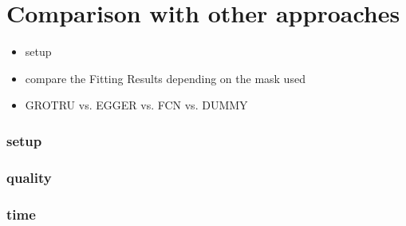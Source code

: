 \chapter{Comparison with other approaches}
	\begin{itemize}
		\item setup
		\item compare the Fitting Results depending on the mask used
		\item GROTRU vs. EGGER vs. FCN vs. DUMMY 
	\end{itemize}
\subsection{setup}
\subsection{quality}
\subsection{time}